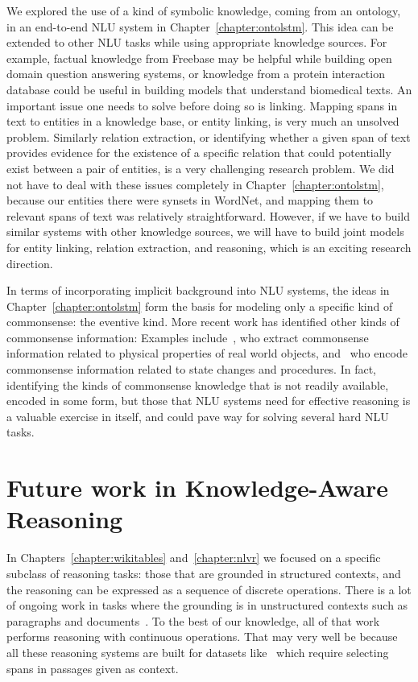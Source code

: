 We explored the use of a kind of symbolic knowledge, coming from an ontology, in
an end-to-end NLU system in Chapter~\ref{chapter:ontolstm}. This idea can be
extended to other NLU tasks while using appropriate knowledge sources.
For example, factual knowledge from Freebase may be helpful while building open
domain question answering systems, or knowledge from a protein interaction
database could be useful in building models that understand biomedical texts.
An important issue one needs to solve before doing so is linking. Mapping spans
in text to entities in a knowledge base, or entity linking, is very much an
unsolved problem. Similarly relation extraction, or identifying whether a given
span of text provides evidence for the existence of a specific relation that
could potentially exist between a pair of entities, is a very challenging
research problem. We did not have to deal with these issues completely in
Chapter~\ref{chapter:ontolstm}, because our entities there were synsets in
WordNet, and mapping them to relevant spans of text was relatively
straightforward. However, if we have to build similar systems with other
knowledge sources, we will have to build joint models for entity linking,
relation extraction, and reasoning, which is an exciting research direction.


In terms of incorporating implicit background into NLU systems, the ideas
in Chapter~\ref{chapter:ontolstm} form the basis for modeling only a specific
kind of commonsense: the eventive kind. More recent work has identified other
kinds of commonsense information: Examples include~\cite{forbes2017verb}, who
extract commonsense information related to physical properties of real world
objects, and~\cite{Tandon2018ReasoningAA} who encode commonsense information
related to state changes and procedures. In fact, identifying the kinds of
commonsense knowledge that is not readily available, encoded in some form, 
but those that NLU systems need for effective reasoning is a valuable exercise
in itself, and could pave way for solving several hard NLU tasks.

\section{Future work in Knowledge-Aware Reasoning}
In Chapters~\ref{chapter:wikitables} and~\ref{chapter:nlvr} we focused on a
specific subclass of reasoning tasks: those that are grounded in structured
contexts, and the reasoning can be expressed as a sequence of discrete
operations. There is a lot of ongoing work in tasks where the grounding is in
unstructured contexts such as paragraphs and
documents~\citep[among others]{hill2015goldilocks,Seo2016BidirectionalAF,dhingra2016gated,Xiong2016DynamicMN,yu2018qanet}.
To the best of our knowledge, all of that work performs reasoning with
continuous operations.
That may very well be because all these reasoning systems are built for datasets
like~\cite[among others]{Richardson2013MCTestAC,Rajpurkar2016SQuAD10,Joshi2017TriviaQAAL}
which require selecting spans in passages given as context.

